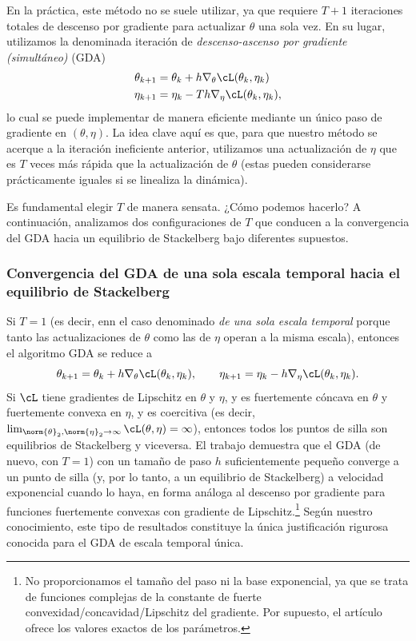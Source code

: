 \documentclass[../../book-main_es.tex]{subfiles}
\begin{document}
En la práctica, este método no se suele utilizar, ya que requiere \(T + 1\)
iteraciones totales de descenso por gradiente para actualizar \(\theta\) una sola vez. En su lugar,
utilizamos la denominada iteración de \textit{descenso-ascenso por gradiente (simultáneo)}
(GDA)
\begin{align}
    \theta_{k + 1}
    &= \theta_{k} + h\nabla_{\theta}\cL(\theta_{k}, \eta_{k}) \\
    \eta_{k + 1}
    &= \eta_{k} - Th\nabla_{\eta}\cL(\theta_{k}, \eta_{k}),
\end{align}
lo cual se puede implementar de manera eficiente mediante un único paso de gradiente en
\((\theta, \eta)\). La idea clave aquí es que, para que nuestro método
se acerque a la iteración ineficiente anterior, utilizamos una actualización de \(\eta\)
que es \(T\) veces más rápida que la actualización de \(\theta\) (estas pueden
considerarse prácticamente iguales si se linealiza la dinámica).

Es fundamental elegir \(T\) de manera sensata. ¿Cómo podemos hacerlo? A continuación,
analizamos dos configuraciones de \(T\) que conducen a
la convergencia del GDA hacia un equilibrio de Stackelberg bajo diferentes supuestos.

\subsubsection{Convergencia del GDA de una sola escala temporal hacia el equilibrio de Stackelberg}

Si \(T = 1\) (es decir, enn el caso denominado \textit{de una sola escala temporal} porque tanto
las actualizaciones de \(\theta\) como las de \(\eta\) operan a la misma escala), entonces el algoritmo GDA
se reduce a
\begin{equation}
    \theta_{k + 1} = \theta_{k} + h\nabla_{\theta}\cL(\theta_{k},
    \eta_{k}), \qquad \eta_{k + 1} = \eta_{k} -
    h\nabla_{\eta}\cL(\theta_{k}, \eta_{k}).
\end{equation}
Si \(\cL\) tiene gradientes de Lipschitz en \(\theta\) y \(\eta\), y es
fuertemente cóncava en \(\theta\) y fuertemente convexa en \(\eta\), y
es coercitiva (es decir, \(\lim_{\norm{\theta}_{2}, \norm{\eta}_{2} \to
\infty}\cL(\theta, \eta) = \infty\)), entonces todos los puntos de silla son
equilibrios de Stackelberg y viceversa. El trabajo
\cite{zamani2024convergence} demuestra que el GDA (de nuevo, con \(T = 1\))
con un tamaño de paso \(h\) suficientemente pequeño converge a un punto de silla
(y, por lo tanto, a un equilibrio de Stackelberg) a velocidad exponencial cuando lo haya,
en forma análoga al descenso por gradiente para funciones fuertemente convexas con
gradiente de Lipschitz.\footnote{No proporcionamos el tamaño del paso ni
    la base exponencial, ya que se trata de funciones complejas de la
    constante de fuerte convexidad/concavidad/Lipschitz del gradiente. Por supuesto,
    el artículo \cite{zamani2024convergence} ofrece los valores exactos de los parámetros.} 
Según nuestro conocimiento, este tipo de resultados constituye la única
justificación rigurosa conocida para el GDA de escala temporal única.
\end{document}

